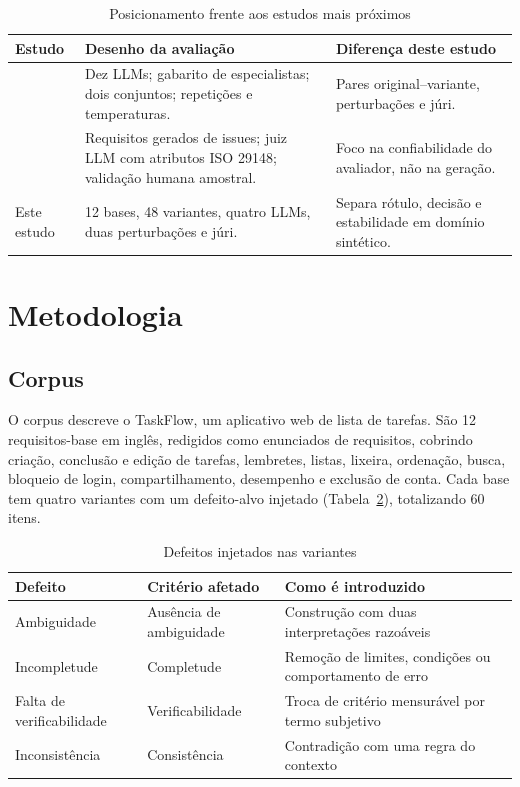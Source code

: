 \documentclass[12pt]{article}
\begin{document}
\begin{table}[ht]
\centering
\caption{Posicionamento frente aos estudos mais próximos}
\label{tab:relacionados}
\small
\begin{tabularx}{\textwidth}{@{}lXX@{}}
\toprule
Estudo & Desenho da avaliação & Diferença deste estudo \\
\midrule
\citet{shefa2026} & Dez LLMs; gabarito de especialistas; dois conjuntos; repetições e temperaturas. & Pares original--variante, perturbações e júri. \\
\citet{paiva2026} & Requisitos gerados de issues; juiz LLM com atributos ISO 29148; validação humana amostral. & Foco na confiabilidade do avaliador, não na geração. \\
Este estudo & 12 bases, 48 variantes, quatro LLMs, duas perturbações e júri. & Separa rótulo, decisão e estabilidade em domínio sintético. \\
\bottomrule
\end{tabularx}
\end{table}

\section{Metodologia}

\subsection{Corpus}

O corpus descreve o TaskFlow, um aplicativo web de lista de tarefas. São 12 requisitos-base em inglês, redigidos como enunciados de requisitos, cobrindo criação, conclusão e edição de tarefas, lembretes, listas, lixeira, ordenação, busca, bloqueio de login, compartilhamento, desempenho e exclusão de conta. Cada base tem quatro variantes com um defeito-alvo injetado (Tabela~\ref{tab:defeitos}), totalizando 60 itens.

\begin{table}[ht]
\centering
\caption{Defeitos injetados nas variantes}
\label{tab:defeitos}
\small
\begin{tabularx}{\textwidth}{@{}llX@{}}
\toprule
Defeito & Critério afetado & Como é introduzido \\
\midrule
Ambiguidade & Ausência de ambiguidade & Construção com duas interpretações razoáveis \\
Incompletude & Completude & Remoção de limites, condições ou comportamento de erro \\
Falta de verificabilidade & Verificabilidade & Troca de critério mensurável por termo subjetivo \\
Inconsistência & Consistência & Contradição com uma regra do contexto \\
\bottomrule
\end{tabularx}
\end{table}
\end{document}
